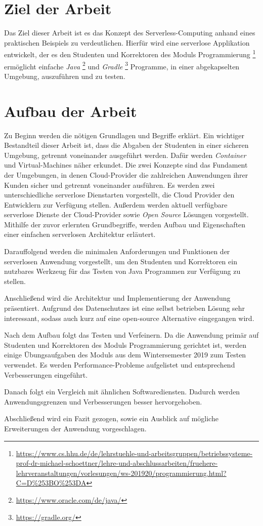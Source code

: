 \section{Ziel der Arbeit}
Das Ziel dieser Arbeit ist es das Konzept des Serverless-Computing anhand eines praktischen
Beispiels zu verdeutlichen. Hierfür wird eine serverlose Applikation entwickelt,
der es den Studenten und Korrektoren des Moduls Programmierung
\footnote{\url{https://www.cs.hhu.de/de/lehrstuehle-und-arbeitsgruppen/betriebssysteme-prof-dr-michael-schoettner/lehre-und-abschlussarbeiten/fruehere-lehrveranstaltungen/vorlesungen/ws-201920/programmierung.html?C=D\%253BO\%253DA}}
ermöglicht einfache \textit{Java} \footnote{\url{https://www.oracle.com/de/java/}}
und \textit{Gradle} \footnote{\url{https://gradle.org/}} Programme, in einer
abgekapselten Umgebung, auszuführen und zu testen.


\section{Aufbau der Arbeit}
Zu Beginn werden die nötigen Grundlagen und Begriffe erklärt.
Ein wichtiger Bestandteil dieser Arbeit ist, dass die Abgaben der Studenten in einer sicheren Umgebung,
getrennt voneinander ausgeführt werden. Dafür werden \textit{Container} \cite{Docker} und Virtual-Machines 
näher erkundet. Die zwei Konzepte sind das Fundament der Umgebungen, in denen Cloud-Provider die zahlreichen 
Anwendungen ihrer Kunden sicher und getrennt voneinander ausführen.
Es werden zwei unterschiedliche serverlose Dienstarten vorgestellt, die Cloud Provider
den Entwicklern zur Verfügung stellen.
Außerdem werden aktuell verfügbare serverlose Dienste der Cloud-Provider sowie \textit{Open Source} 
Lösungen vorgestellt. Mithilfe der zuvor erlernten Grundbegriffe, werden Aufbau und 
Eigenschaften einer einfachen serverlosen Architektur erläutert.

Darauffolgend werden die minimalen Anforderungen und Funktionen der serverlosen Anwendung vorgestellt, um den Studenten und Korrektoren ein nutzbares Werkzeug für das Testen von Java Programmen zur Verfügung zu stellen.

Anschließend wird die Architektur und Implementierung der Anwendung präsentiert. Aufgrund des Datenschutzes ist eine selbst betrieben Lösung sehr interessant, sodass auch kurz auf eine open-source Alternative eingegangen wird.

Nach dem Aufbau folgt das Testen und Verfeinern. Da die Anwendung primär auf Studenten und Korrektoren des Moduls Programmierung gerichtet ist, werden einige Übungsaufgaben des Moduls aus dem Wintersemester 2019 zum Testen verwendet. Es werden Performance-Probleme aufgelistet und entsprechend Verbesserungen eingeführt.

Danach folgt ein Vergleich mit ähnlichen Softwarediensten. Dadurch werden Anwendungsgrenzen und Verbesserungen besser hervorgehoben.

Abschließend wird ein Fazit gezogen, sowie ein Ausblick auf mögliche Erweiterungen der Anwendung vorgeschlagen.
